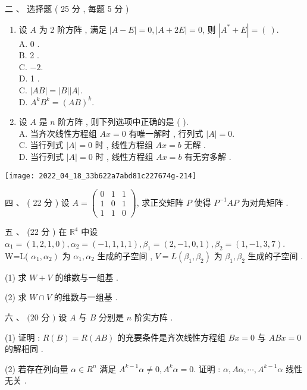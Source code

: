 \documentclass[10pt]{article}
\begin{document}
{\begin{enumerate}
\end{enumerate}
 二 、 选择题 ( 25  分 , 每题 5 分 )

\begin{enumerate}
  \item  设  $A$  为  2  阶方阵 ,  满足  $|A-E|=0,|A+2 E|=0$,  则  $\left|A^{*}+E\right|=(~)$.\\
A. 0 .\\
B. 2 .\\
C. $-2$.\\
D. 1 .\\
C. $|A B|=|B||A|$.\\
D. $A^{k} B^{k}=(A B)^{k}$.

  \item  设  $A$  是  $n$  阶方阵 ,  则下列选项中正确的是  ( ).\\
A.  当齐次线性方程组  $A x=0$  有唯一解时 ,  行列式  $|A|=0$.\\
C.  当行列式  $|A|=0$  时 ,  线性方程组  $A x=b$  无解 .\\
D.  当行列式  $|A|=0$  时 ,  线性方程组  $A x=b$  有无穷多解 .

\end{enumerate}
\texttt{[image: 2022\_04\_18\_33b622a7abd81c227674g-214]}

 四 、 ( 22  分 )  设  $A=\left(\begin{array}{lll}0 & 1 & 1 \\ 1 & 0 & 1 \\ 1 & 1 & 0\end{array}\right)$,  求正交矩阵  $P$  使得  $P^{-1} A P$  为对角矩阵 .

 五 、 (22  分 )  在  $\mathbb{R}^{4}$  中设  $\alpha_{1}=(1,2,1,0), \alpha_{2}=(-1,1,1,1), \beta_{1}=(2,-1,0,1), \beta_{2}=(1,-1,3,7)$. W=L( $\left.\alpha_{1}, \alpha_{2}\right)$  为  $\alpha_{1}, \alpha_{2}$  生成的子空间 , $V=L\left(\beta_{1}, \beta_{2}\right)$  为  $\beta_{1}, \beta_{2}$  生成的子空间 .

(1)  求  $W+V$  的维数与一组基 .

(2)  求  $W \cap V$  的维数与一组基 .

 六 、 $(20$  分  $)$  设  $A$  与  $B$  分别是  $n$  阶实方阵 .

(1)  证明 : $R(B)=R(A B)$  的充要条件是齐次线性方程组  $B x=0$  与  $A B x=0$  的解相同 .

(2)  若存在列向量  $\alpha \in R^{n}$  满足  $A^{k-1} \alpha \neq 0, A^{k} \alpha=0$.  证明 : $\alpha, A \alpha, \cdots, A^{k-1} \alpha$  线性无关 .

}
\end{document}
